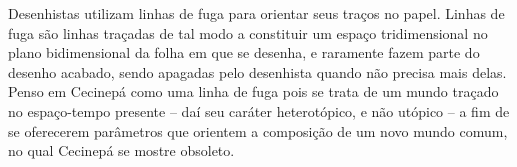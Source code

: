 Desenhistas utilizam linhas de fuga para orientar seus traços no papel. Linhas de fuga são linhas traçadas de tal modo a constituir um espaço tridimensional no plano bidimensional da folha em que se desenha, e raramente fazem parte do desenho acabado, sendo apagadas pelo desenhista quando não precisa mais delas. Penso em Cecinepá como uma linha de fuga pois se trata de um mundo traçado no espaço-tempo presente -- daí seu caráter heterotópico, e não utópico -- a fim de se oferecerem parâmetros que orientem a composição de um novo mundo comum, no qual Cecinepá se mostre obsoleto.